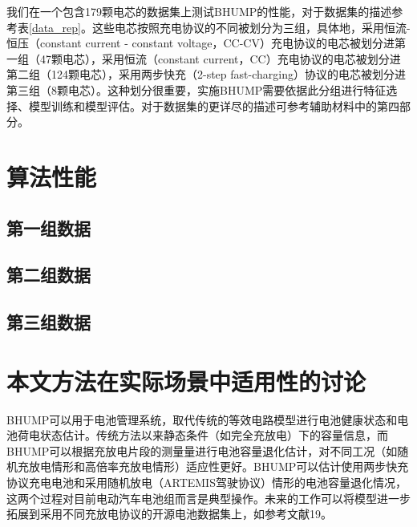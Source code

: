 \documentclass{article}
\begin{document}
我们在一个包含179颗电芯的数据集上测试BHUMP的性能，对于数据集的描述参考表\ref{data_rep}。这些电芯按照充电协议的不同被划分为三组，具体地，采用恒流-恒压（constant current - constant voltage，CC-CV）充电协议的电芯被划分进第一组（47颗电芯），采用恒流（constant current，CC）充电协议的电芯被划分进第二组（124颗电芯），采用两步快充（2-step fast-charging）协议的电芯被划分进第三组（8颗电芯）。这种划分很重要，实施BHUMP需要依据此分组进行特征选择、模型训练和模型评估。对于数据集的更详尽的描述可参考辅助材料中的第四部分。

\section{算法性能}

\subsection{第一组数据}

\subsection{第二组数据}

\subsection{第三组数据}

\section{本文方法在实际场景中适用性的讨论}

BHUMP可以用于电池管理系统，取代传统的等效电路模型进行电池健康状态和电池荷电状态估计。传统方法以来静态条件（如完全充放电）下的容量信息，而BHUMP可以根据充放电片段的测量量进行电池容量退化估计，对不同工况（如随机充放电情形和高倍率充放电情形）适应性更好。BHUMP可以估计使用两步快充协议充电电池和采用随机放电（ARTEMIS驾驶协议）情形的电池容量退化情况，这两个过程对目前电动汽车电池组而言是典型操作。未来的工作可以将模型进一步拓展到采用不同充放电协议的开源电池数据集上，如参考文献19。
\end{document}
